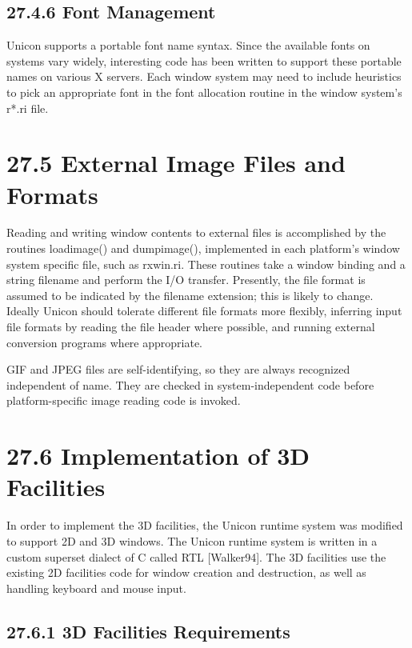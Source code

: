 \subsection[27.4.6 Font Management]{27.4.6 Font Management}

Unicon supports a portable font name syntax. Since the available fonts
on systems vary widely, {\textquotedbl}interesting{\textquotedbl} code
has been written to support these portable names on various X servers.
Each window system may need to include heuristics to pick an
appropriate font in the font allocation routine in the window system's
\textsf{r*.ri} file.

\section[27.5 External Image Files and Formats]{27.5 External Image Files and Formats}

Reading and writing window contents to external files is accomplished
by the routines \textsf{loadimage()} and \textsf{dumpimage()},
implemented in each platform's window system specific file, such as
\textsf{rxwin.ri}. These routines take a window binding and a string
filename and perform the I/O transfer. Presently, the file format is
assumed to be indicated by the filename extension; this is likely to
change. Ideally Unicon should tolerate different file formats more
flexibly, inferring input file formats by reading the file header
where possible, and running external conversion programs where
appropriate.

GIF and JPEG files are self-identifying, so they are always recognized
independent of name. They are checked in system-independent code
before platform-specific image reading code is invoked.


\section[27.6 Implementation of 3D Facilities]{27.6 Implementation of 3D Facilities}

In order to implement the 3D facilities, the Unicon runtime system was
modified to support 2D and 3D windows. The Unicon runtime system is
written in a custom superset dialect of C called RTL [Walker94]. The
3D facilities use the existing 2D facilities code for window creation
and destruction, as well as handling keyboard and mouse input.

\subsection[27.6.1 3D Facilities Requirements]{27.6.1 3D Facilities Requirements}

